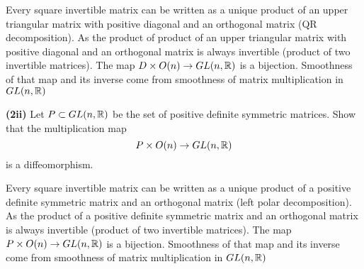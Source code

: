 \documentclass{article}
\begin{document}
\begin{longproof}
    Every square invertible matrix can be written as a unique product of an upper triangular matrix with positive diagonal and an orthogonal matrix (QR decomposition). As the product of product of an upper triangular matrix with positive diagonal and an orthogonal matrix is always invertible (product of two invertible matrices). The map $D \times O(n) \to GL(n, \mathbb{R})$ is a bijection. Smoothness of that map and its inverse come from smoothness of matrix multiplication in $GL(n, \mathbb{R})$
\end{longproof}

\textbf{(2ii)} Let $P \subset GL(n, \mathbb{R})$ be the set of positive definite symmetric matrices. Show that the multiplication map
$$
    P \times O(n) \to GL(n, \mathbb{R})
$$
is a diffeomorphism.

Every square invertible matrix can be written as a unique product of a positive definite symmetric matrix and an orthogonal matrix (left polar decomposition). As the product of a positive definite symmetric matrix and an orthogonal matrix is always invertible (product of two invertible matrices). The map $P \times O(n) \to GL(n, \mathbb{R})$ is a bijection. Smoothness of that map and its inverse come from smoothness of matrix multiplication in $GL(n, \mathbb{R})$
\end{document}

